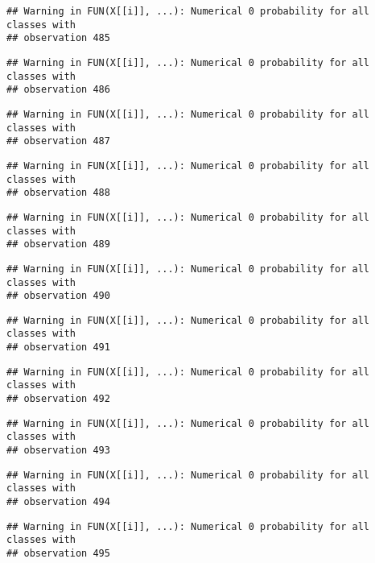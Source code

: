 \documentclass[
]{article}
\begin{document}
\begin{verbatim}
## Warning in FUN(X[[i]], ...): Numerical 0 probability for all classes with
## observation 485
\end{verbatim}

\begin{verbatim}
## Warning in FUN(X[[i]], ...): Numerical 0 probability for all classes with
## observation 486
\end{verbatim}

\begin{verbatim}
## Warning in FUN(X[[i]], ...): Numerical 0 probability for all classes with
## observation 487
\end{verbatim}

\begin{verbatim}
## Warning in FUN(X[[i]], ...): Numerical 0 probability for all classes with
## observation 488
\end{verbatim}

\begin{verbatim}
## Warning in FUN(X[[i]], ...): Numerical 0 probability for all classes with
## observation 489
\end{verbatim}

\begin{verbatim}
## Warning in FUN(X[[i]], ...): Numerical 0 probability for all classes with
## observation 490
\end{verbatim}

\begin{verbatim}
## Warning in FUN(X[[i]], ...): Numerical 0 probability for all classes with
## observation 491
\end{verbatim}

\begin{verbatim}
## Warning in FUN(X[[i]], ...): Numerical 0 probability for all classes with
## observation 492
\end{verbatim}

\begin{verbatim}
## Warning in FUN(X[[i]], ...): Numerical 0 probability for all classes with
## observation 493
\end{verbatim}

\begin{verbatim}
## Warning in FUN(X[[i]], ...): Numerical 0 probability for all classes with
## observation 494
\end{verbatim}

\begin{verbatim}
## Warning in FUN(X[[i]], ...): Numerical 0 probability for all classes with
## observation 495
\end{verbatim}
\end{document}
